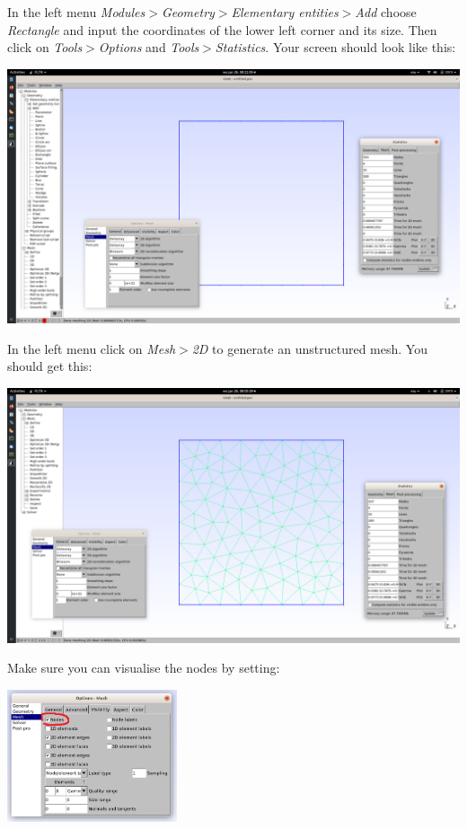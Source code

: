 
In the left menu {\sl Modules$>$Geometry$>$Elementary entities$>$Add} 
choose {\sl Rectangle} and input the coordinates 
of the lower left corner and its size.
Then click on {\sl Tools$>$Options} and {\sl Tools$>$Statistics}. Your screen should look like this:

\includegraphics[width=15cm]{images/app_gmsh/gmsh_00}

In the left menu click on {\sl Mesh$>$2D} to generate an unstructured mesh. You should get this:

\includegraphics[width=15cm]{images/app_gmsh/gmsh_03}

Make sure you can visualise the nodes by setting:

\begin{center}
\includegraphics[width=5cm]{images/app_gmsh/gmsh_01}
\end{center}

